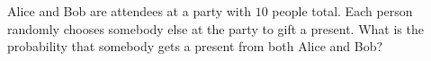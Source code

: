 Alice and Bob are attendees at a party with $10$ people total. Each person randomly chooses somebody else at the party to gift a present. What is the probability that somebody gets a present from both Alice and Bob?
